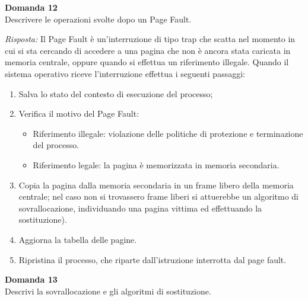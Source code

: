 \documentclass{article}
\newenvironment{problem}[2][Domanda]
    { \begin{mdframed}[backgroundcolor=gray!20] \textbf{#1 #2} \\}
    {  \end{mdframed}}
\newenvironment{solution}
    {\textit{Risposta:}}
    {}
\begin{document}
\begin{problem}{12}
Descrivere le operazioni svolte dopo un Page Fault.
\end{problem}
\begin{solution}
Il Page Fault è un’interruzione di tipo trap che scatta nel momento in cui si sta cercando di accedere a una pagina che non è ancora stata caricata in memoria centrale, oppure quando si effettua un riferimento illegale.
\newline
Quando il sistema operativo riceve l’interruzione effettua i seguenti passaggi:
\begin{enumerate}
    \item Salva lo stato del contesto di esecuzione del processo;
    \item Verifica il motivo del Page Fault:
    \begin{itemize}
        \item Riferimento illegale: violazione delle politiche di protezione e terminazione del processo.
        \item Riferimento legale: la pagina è memorizzata in memoria secondaria.
    \end{itemize}
    \item Copia la pagina dalla memoria secondaria in un frame libero della memoria centrale; nel caso non si trovassero frame liberi si attuerebbe un algoritmo di sovrallocazione, individuando una pagina vittima ed effettuando la sostituzione).
    \item Aggiorna la tabella delle pagine.
    \item Ripristina il processo, che riparte dall’istruzione interrotta dal page fault.
\end{enumerate}
\end{solution}
\begin{problem}{13}
Descrivi la sovrallocazione e gli algoritmi di sostituzione.
\end{problem}
\end{document}
